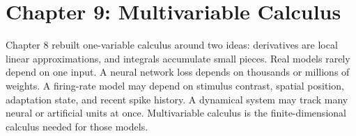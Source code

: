 \section{Chapter 9: Multivariable Calculus}
\label{ch:multivariable-calculus}

Chapter 8 rebuilt one-variable calculus around two ideas: derivatives are local linear approximations, and integrals accumulate small pieces. Real models rarely depend on one input. A neural network loss depends on thousands or millions of weights. A firing-rate model may depend on stimulus contrast, spatial position, adaptation state, and recent spike history. A dynamical system may track many neural or artificial units at once. Multivariable calculus is the finite-dimensional calculus needed for those models.


